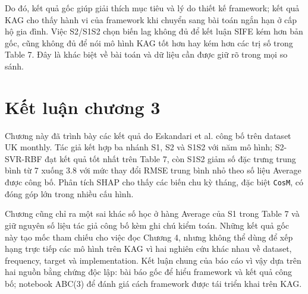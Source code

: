 Do đó, kết quả gốc giúp giải thích mục tiêu và lý do thiết kế framework; kết quả KAG cho thấy hành vi của framework khi chuyển sang bài toán ngắn hạn ở cấp hộ gia đình. Việc S2/S1S2 chọn biến lag không đủ để kết luận SIFE kém hơn bản gốc, cũng không đủ để nói mô hình KAG tốt hơn hay kém hơn các trị số trong Table 7. Đây là khác biệt về bài toán và dữ liệu cần được giữ rõ trong mọi so sánh.

\section{Kết luận chương 3}

Chương này đã trình bày các kết quả do Eskandari et al. công bố trên dataset UK monthly. Tác giả kết hợp ba nhánh S1, S2 và S1S2 với năm mô hình; S2-SVR-RBF đạt kết quả tốt nhất trên Table 7, còn S1S2 giảm số đặc trưng trung bình từ 7 xuống 3.8 với mức thay đổi RMSE trung bình nhỏ theo số liệu Average được công bố. Phân tích SHAP cho thấy các biến chu kỳ tháng, đặc biệt \texttt{CosM}, có đóng góp lớn trong nhiều cấu hình.

Chương cũng chỉ ra một sai khác số học ở hàng Average của S1 trong Table 7 và giữ nguyên số liệu tác giả công bố kèm ghi chú kiểm toán. Những kết quả gốc này tạo mốc tham chiếu cho việc đọc Chương 4, nhưng không thể dùng để xếp hạng trực tiếp các mô hình trên KAG vì hai nghiên cứu khác nhau về dataset, frequency, target và implementation. Kết luận chung của báo cáo vì vậy dựa trên hai nguồn bằng chứng độc lập: bài báo gốc để hiểu framework và kết quả công bố; notebook ABC(3) để đánh giá cách framework được tái triển khai trên KAG.
